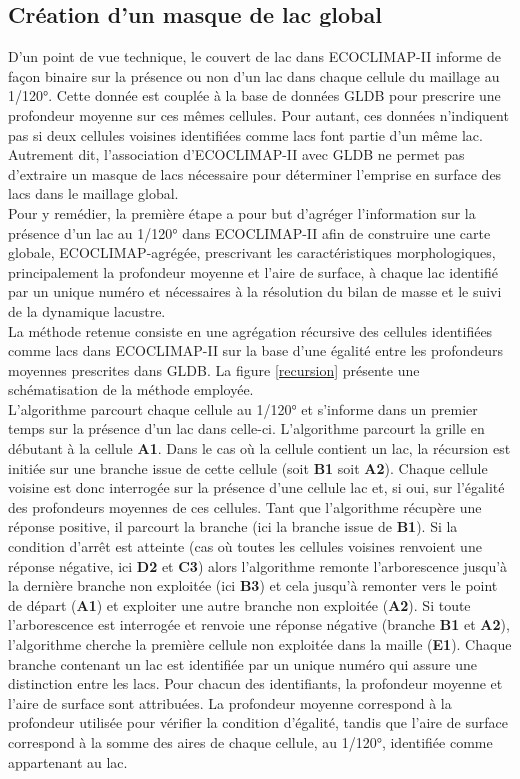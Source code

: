 \subsection{{\selectfont Création d'un masque de lac global}}
\label{sec:masque_lac}
D'un point de vue technique, le couvert de lac dans ECOCLIMAP-II informe de façon binaire sur la présence ou non d'un lac dans chaque cellule du maillage au 1/120°. Cette donnée est couplée à la base de données GLDB pour prescrire une profondeur moyenne sur ces mêmes cellules. Pour autant, ces données n'indiquent pas si deux cellules voisines identifiées comme lacs font partie d'un même lac. Autrement dit, l'association d'ECOCLIMAP-II avec GLDB ne permet pas d'extraire un masque de lacs nécessaire pour déterminer l'emprise en surface des lacs dans le maillage global. \\
Pour y remédier, la première étape a pour but d'agréger l'information sur la présence d'un lac au 1/120° dans ECOCLIMAP-II afin de construire une carte globale, ECOCLIMAP-agrégée, prescrivant les caractéristiques morphologiques, principalement la profondeur moyenne et l'aire de surface, à chaque lac identifié par un unique numéro et nécessaires à la résolution du bilan de masse et le suivi de la dynamique lacustre.\\
La méthode retenue consiste en une agrégation récursive des cellules identifiées comme lacs dans ECOCLIMAP-II sur la base d'une égalité entre les profondeurs moyennes prescrites dans GLDB. La figure \ref{recursion} présente une schématisation de la méthode employée.\\

\noindent L'algorithme parcourt chaque cellule au 1/120° et s'informe dans un premier temps sur la présence d'un lac dans celle-ci. L'algorithme parcourt la grille en débutant à la cellule \textbf{A1}. Dans le cas où la cellule contient un lac, la récursion est initiée sur une branche issue de cette cellule (soit \textbf{B1} soit \textbf{A2}). Chaque cellule voisine est donc interrogée sur la présence d'une cellule lac et, si oui, sur l'égalité des profondeurs moyennes de ces cellules. Tant que l'algorithme récupère une réponse positive, il parcourt la branche (ici la branche issue de \textbf{B1}). Si la condition d'arrêt est atteinte (cas où toutes les cellules voisines renvoient une réponse négative, ici \textbf{D2} et \textbf{C3}) alors l'algorithme remonte l'arborescence jusqu'à la dernière branche non exploitée (ici \textbf{B3}) et cela jusqu'à remonter vers le point de départ (\textbf{A1}) et exploiter une autre branche non exploitée (\textbf{A2}). Si toute l'arborescence est interrogée et renvoie une réponse négative (branche \textbf{B1} et \textbf{A2}), l'algorithme cherche la première cellule non exploitée dans la maille (\textbf{E1}). Chaque branche contenant un lac est identifiée par un unique numéro qui assure une distinction entre les lacs. Pour chacun des identifiants, la profondeur moyenne et l'aire de surface sont attribuées. La profondeur moyenne correspond à la profondeur utilisée pour vérifier la condition d'égalité, tandis que l'aire de surface correspond à la somme des aires de chaque cellule, au 1/120°, identifiée comme appartenant au lac.\\


